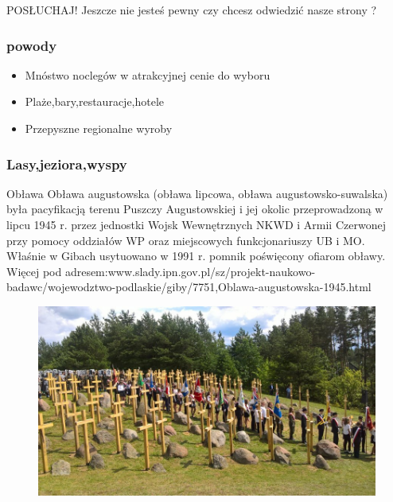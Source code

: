 \documentclass[]{beamer}
\begin{document}
\frame
{
\begin{alertblock}
{POSŁUCHAJ!}
Jeszcze nie jesteś pewny czy chcesz odwiedzić nasze strony ?
\end{alertblock}
\frame
\frametitle{powody}
\begin{itemize}
\item Mnóstwo noclegów w atrakcyjnej cenie do wyboru 
\item Plaże,bary,restauracje,hotele 
\item Przepyszne regionalne wyroby 
\end{itemize}}
\frame
{
 \frametitle{Lasy,jeziora,wyspy}
 \begin{block}
 {Obława}
Obława augustowska (obława lipcowa, obława augustowsko-suwalska) była pacyfikacją terenu Puszczy Augustowskiej i jej okolic przeprowadzoną w lipcu 1945 r. przez jednostki Wojsk Wewnętrznych NKWD i Armii Czerwonej przy pomocy oddziałów WP oraz miejscowych funkcjonariuszy UB i MO.
 Właśnie w Gibach usytuowano w 1991 r. pomnik poświęcony ofiarom obławy. Więcej pod adresem:www.slady.ipn.gov.pl/sz/projekt-naukowo-badawc/wojewodztwo-podlaskie/giby/7751,Oblawa-augustowska-1945.html
\end{block}}
\frame
{
\begin{figure}[here]
\begin{center}
\includegraphics[scale=0.5]{giby3.jpg}
\end{center}
\end{figure}
}
\frame
\end{document}
